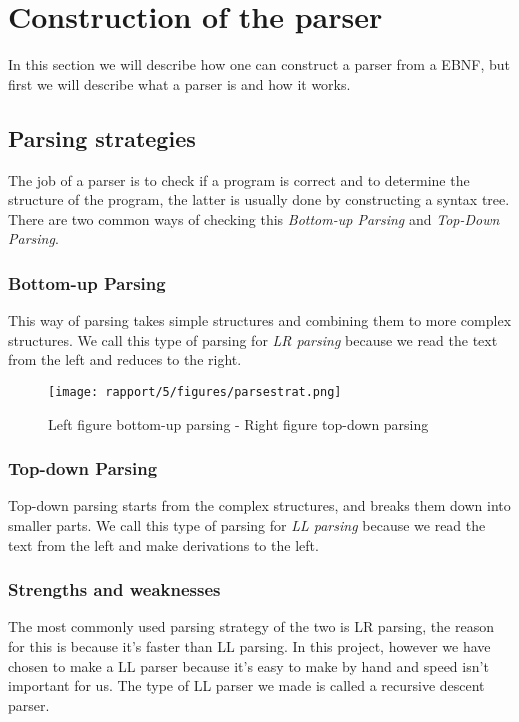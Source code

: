 \section{Construction of the parser}
	In this section we will describe how one can construct a parser from a EBNF, but first we will describe what a parser is and how it works.
	
	\subsection{Parsing strategies}
		The job of a parser is to check if a program is correct and 
		to determine the structure of the program, the latter is usually done by constructing a syntax tree.
		There are two common ways of checking this {\it Bottom-up Parsing} and {\it Top-Down Parsing}.
		
		\subsubsection*{Bottom-up Parsing}
			This way of parsing takes simple structures and combining them to more complex structures.
			We call this type of parsing for {\it LR parsing} because we read the text from the left and reduces to the right.
			\begin{figure}[H]
				\centering
				\texttt{[image: rapport/5/figures/parsestrat.png]}
				\caption{Left figure bottom-up parsing - Right figure top-down parsing}\label{fig:lrparse}
			\end{figure}
			
		\subsubsection*{Top-down Parsing}
			Top-down parsing starts from the complex structures, and breaks them down into smaller parts.
			We call this type of parsing for {\it LL parsing} because we read the text from the left and make derivations to the left.
		
		\subsubsection*{Strengths and weaknesses}
			The most commonly used parsing strategy of the two is LR parsing, the reason for this is because it's faster than LL parsing.
			In this project, however we have chosen to make a LL parser because it's easy to make by hand and speed isn't important for us. 
			The type of LL parser we made is called a recursive descent parser.
			
